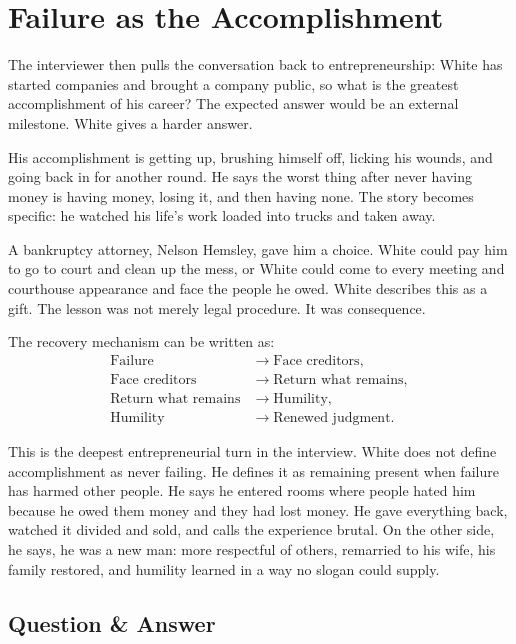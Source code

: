\section{Failure as the Accomplishment}

The interviewer then pulls the conversation back to entrepreneurship: White has started companies and brought a company public, so what is the greatest accomplishment of his career? The expected answer would be an external milestone. White gives a harder answer.

His accomplishment is getting up, brushing himself off, licking his wounds, and going back in for another round. He says the worst thing after never having money is having money, losing it, and then having none. The story becomes specific: he watched his life's work loaded into trucks and taken away.

A bankruptcy attorney, Nelson Hemsley, gave him a choice. White could pay him to go to court and clean up the mess, or White could come to every meeting and courthouse appearance and face the people he owed. White describes this as a gift. The lesson was not merely legal procedure. It was consequence.

The recovery mechanism can be written as:
\begin{align}
\text{Failure}
&\longrightarrow \text{Face creditors},\\
\text{Face creditors}
&\longrightarrow \text{Return what remains},\\
\text{Return what remains}
&\longrightarrow \text{Humility},\\
\text{Humility}
&\longrightarrow \text{Renewed judgment}.
\end{align}

This is the deepest entrepreneurial turn in the interview. White does not define accomplishment as never failing. He defines it as remaining present when failure has harmed other people. He says he entered rooms where people hated him because he owed them money and they had lost money. He gave everything back, watched it divided and sold, and calls the experience brutal. On the other side, he says, he was a new man: more respectful of others, remarried to his wife, his family restored, and humility learned in a way no slogan could supply.

\subsection{Question \& Answer}

